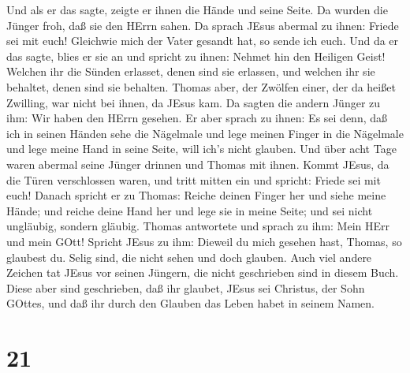  Und als er das sagte, zeigte er ihnen die Hände und seine
Seite. Da wurden die Jünger froh, daß sie den HErrn sahen. 
Da sprach JEsus abermal zu ihnen: Friede sei mit euch! Gleichwie mich
der Vater gesandt hat, so sende ich euch.  Und da er das
sagte, blies er sie an und spricht zu ihnen: Nehmet hin den Heiligen
Geist!  Welchen ihr die Sünden erlasset, denen sind sie
erlassen, und welchen ihr sie behaltet, denen sind sie behalten.
 Thomas aber, der Zwölfen einer, der da heißet Zwilling,
war nicht bei ihnen, da JEsus kam.  Da sagten die andern
Jünger zu ihm: Wir haben den HErrn gesehen. Er aber sprach zu ihnen: Es
sei denn, daß ich in seinen Händen sehe die Nägelmale und lege meinen
Finger in die Nägelmale und lege meine Hand in seine Seite, will ich's
nicht glauben.  Und über acht Tage waren abermal seine
Jünger drinnen und Thomas mit ihnen. Kommt JEsus, da die Türen
verschlossen waren, und tritt mitten ein und spricht: Friede sei mit
euch!  Danach spricht er zu Thomas: Reiche deinen Finger
her und siehe meine Hände; und reiche deine Hand her und lege sie in
meine Seite; und sei nicht ungläubig, sondern gläubig. 
Thomas antwortete und sprach zu ihm: Mein HErr und mein GOtt!
 Spricht JEsus zu ihm: Dieweil du mich gesehen hast,
Thomas, so glaubest du. Selig sind, die nicht sehen und doch glauben.
 Auch viel andere Zeichen tat JEsus vor seinen Jüngern, die
nicht geschrieben sind in diesem Buch.  Diese aber sind
geschrieben, daß ihr glaubet, JEsus sei Christus, der Sohn GOttes, und
daß ihr durch den Glauben das Leben habet in seinem Namen.

\hypertarget{section-20}{%
\section{21}\label{section-20}}

